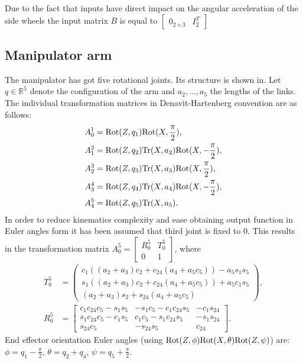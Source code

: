 Due to the fact that inputs have direct impact on the angular acceleration of the side wheels the input matrix $B$ is equal to $\begin{bmatrix}
0_{2 \times 3} & I_2^T
\end{bmatrix}$ 
\subsection{Manipulator arm}
The manipulator has got five rotational joints. Its structure is shown in. %
Let $q\in \mathbb{R}^5$ denote the configuration of the arm and $a_2, \dots, a_5$ the lengths of the links. The individual transformation matrices in Denavit-Hartenberg convention are as follows:
\begin{align*}
A_0^1 &= \mathrm{Rot}(Z, q_1)\mathrm{Rot}(X, \frac{\pi}{2}),\\
A_1^2 &= \mathrm{Rot}(Z, q_2)\mathrm{Tr} (X, a_2)\mathrm{Rot}(X, -\frac{\pi}{2}),\\
A_2^3 &= \mathrm{Rot}(Z, q_3)\mathrm{Tr} (X, a_3)\mathrm{Rot}(X, \frac{\pi}{2}),\\
A_3^4 &= \mathrm{Rot}(Z, q_4)\mathrm{Tr} (X, a_4)\mathrm{Rot}(X, -\frac{\pi}{2}),\\
A_4^5 &= \mathrm{Rot}(Z, q_5)\mathrm{Tr} (X, a_5).
\end{align*}
In order to reduce kinematics complexity and ease obtaining output function in Euler angles form it has been assumed that third joint is fixed to $0$. This results in the transformation matrix $
A_0^5=\begin{bmatrix}
R_0^5 & T_0^5\\
0 & 1
\end{bmatrix}$, 
where
\begin{align*}
T_0^5 &= \begin{pmatrix}
c_1\left((a_2+a_3)c_2 + c_{24}(a_4+a_5c_5)\right) - a_5s_1s_5\\
s_1\left((a_2+a_3)c_2 + c_{24}(a_4+a_5c_5)\right) + a_5c_1s_5\\
    (a_2+a_3)s_2 + s_{24}(a_4+a_5c_5)
\end{pmatrix},\\
R_0^5 &= \begin{bmatrix}
c_1c_{24}c_5-s_1s_5 & -s_1c_5-c_1c_{24}s_5 & -c_1s_{24}\\
s_1c_{24}c_5-c_1s_5 &  c_1c_5-s_1c_{24}s_5 & -s_1s_{24}\\
s_{24}c_5           & -s_{24}s_5           &  c_{24}
\end{bmatrix}.
\end{align*}
End effector orientation Euler angles (using $\mathrm{Rot}(Z,\phi)\mathrm{Rot}(X, \theta)\mathrm{Rot}(Z, \psi)$) are: $\phi=q_1-\frac{\pi}{2}$, $\theta=q_2+q_4$, $\psi=q_5+\frac{\pi}{2}$.

